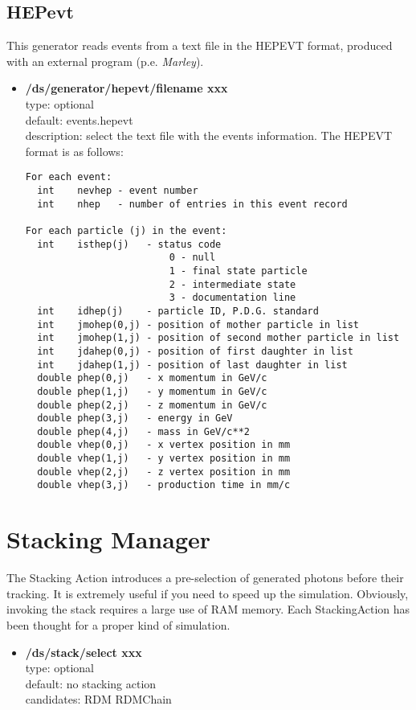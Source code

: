 \documentclass[twocolumn, 10pt]{article}
\begin{document}
\subsection{HEPevt}

This generator reads events from a text file in the HEPEVT format, produced with an external
program (p.e. \textit{Marley}).

\begin{itemize}

\item \textbf{/ds/generator/hepevt/filename xxx}\\
type: optional \\
default: events.hepevt \\
description: select the text file with the events information. The HEPEVT format is as follows:
{\tiny
\begin{verbatim}
For each event:
  int    nevhep - event number
  int    nhep   - number of entries in this event record

For each particle (j) in the event:
  int    isthep(j)   - status code
                         0 - null
                         1 - final state particle
                         2 - intermediate state
                         3 - documentation line
  int    idhep(j)    - particle ID, P.D.G. standard
  int    jmohep(0,j) - position of mother particle in list
  int    jmohep(1,j) - position of second mother particle in list
  int    jdahep(0,j) - position of first daughter in list
  int    jdahep(1,j) - position of last daughter in list
  double phep(0,j)   - x momentum in GeV/c
  double phep(1,j)   - y momentum in GeV/c
  double phep(2,j)   - z momentum in GeV/c
  double phep(3,j)   - energy in GeV
  double phep(4,j)   - mass in GeV/c**2
  double vhep(0,j)   - x vertex position in mm
  double vhep(1,j)   - y vertex position in mm
  double vhep(2,j)   - z vertex position in mm
  double vhep(3,j)   - production time in mm/c
\end{verbatim}
} %

\end{itemize}

\section{Stacking Manager}
The Stacking Action introduces a pre-selection of generated photons before their tracking. It is extremely useful if
you need to speed up the simulation. Obviously, invoking the stack requires a large use of RAM memory. 
Each StackingAction has been thought for a proper kind of simulation.\\
\begin{itemize}

\item \textbf{ /ds/stack/select  xxx}\\
type: optional \\
default: no stacking action   \\
candidates: RDM RDMChain\\
\end{itemize}
\end{document}
